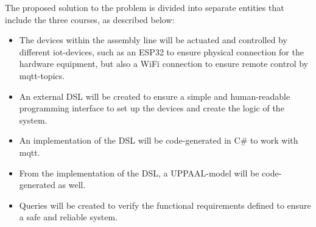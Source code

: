 The proposed solution to the problem is divided into separate entities that include the three courses, as described below:

\begin{itemize}
    \item The devices within the assembly line will be actuated and controlled by different \acrshort{iot}-devices, such as an ESP32 to ensure physical connection for the hardware equipment, but also a WiFi connection to ensure remote control by \acrshort{mqtt}-topics.
    \item An external DSL will be created to ensure a simple and human-readable programming interface to set up the devices and create the logic of the system.
    \item An implementation of the DSL will be code-generated in C\# to work with \acrshort{mqtt}.
    \item From the implementation of the DSL, a UPPAAL-model will be code-generated as well.
    \item Queries will be created to verify the functional requirements defined to ensure a safe and reliable system.
\end{itemize}